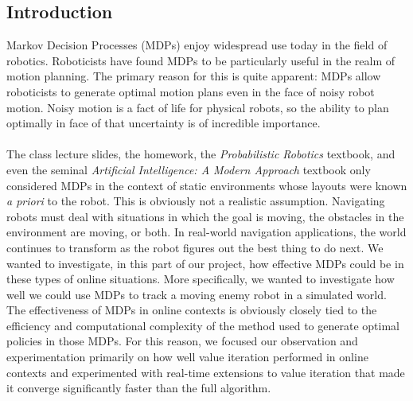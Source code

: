\documentclass{aiaa-tc}%
\begin{document}
\subsection{Introduction}
Markov Decision Processes (MDPs) enjoy widespread use today in the field of robotics. Roboticists have found MDPs to be particularly useful in the realm of motion planning. 
The primary reason for this is quite apparent: MDPs allow roboticists to generate optimal motion plans even in the face of noisy robot motion. Noisy motion is a fact of life for physical robots, so
the ability to plan optimally in face of that uncertainty is of incredible importance. \\ \\
The class lecture slides, the homework, the \emph{Probabilistic Robotics} textbook, and even the seminal \emph{Artificial Intelligence: A Modern Approach} textbook only considered MDPs in the context of static environments whose layouts were known \emph{a priori} to the
robot. This is obviously not a realistic assumption. Navigating robots must deal with situations in which the goal is moving, the obstacles in the environment are moving, or both. In real-world navigation
applications, the world continues to transform as the robot figures out the best thing to do next. We wanted to investigate, in this part of our project, how effective MDPs could be in these types of online situations. More specifically, we wanted to investigate how well we could use MDPs  to track a moving enemy robot in a simulated world. The effectiveness of MDPs in online contexts is obviously
closely tied to the efficiency and computational complexity of the method used to generate optimal policies in those MDPs. For this reason, we focused our observation and experimentation primarily on how well value iteration performed in online contexts and experimented with real-time extensions to value iteration that made it converge significantly faster than the full algorithm.
\end{document}
